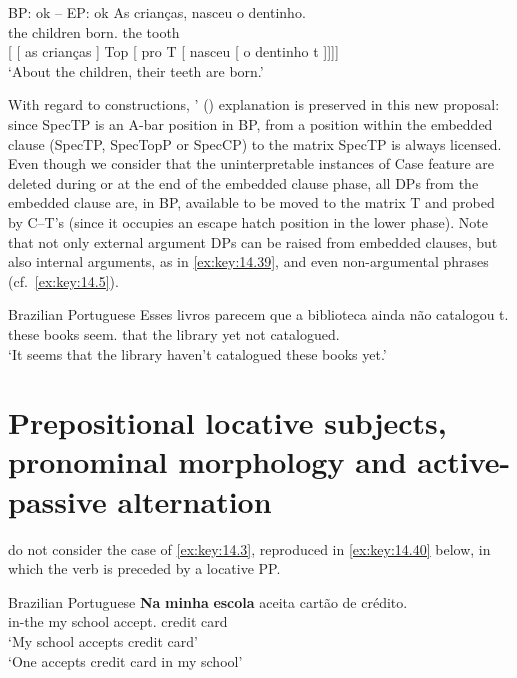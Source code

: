 \documentclass[output=paper]{langsci/langscibook}
\begin{document}
\ea%
    \label{ex:key:14.38} \gls{BP}: ok -- \gls{EP}: ok
    \ea
    \gll    As crianças, nasceu o dentinho.\\
            the children born.\Tsg{} the tooth\\
    \glt
    \ex     {}[ [ as crianças ] Top [ pro\tss{\Expl} T [ nasceu [ o dentinho t ]]]]\\
            ‘About the children, their teeth are born.’
    \z
\z

With regard to  constructions,
\citeauthor{AvelarGalves2011}' (\citeyear{AvelarGalves2011,AvelarGalves2016})
explanation is preserved in this new proposal: since SpecTP is an A-bar
position in BP,  from a position within the embedded clause (SpecTP,
SpecTopP or SpecCP) to the matrix SpecTP is always licensed. Even though we
consider that the uninterpretable instances of Case feature are deleted during
or at the end of the embedded clause phase, all DPs from the embedded clause
are, in BP, available to be moved to the matrix T and probed by C--T’s
 (since it occupies an escape hatch position in the lower
phase).  Note that not only external argument DPs can be raised from embedded
clauses, but also internal arguments, as in \eqref{ex:key:14.39}, and even
non-argumental phrases (cf.\ \eqref{ex:key:14.5}).

\ea\label{ex:key:14.39}Brazilian Portuguese
    \sn
    \gll    Esses  livros parecem que a biblioteca ainda não catalogou t.\\
            these books seem.\Tpl{} that   the library yet not catalogued.\Tsg{}\\
    \glt    ‘It seems that the library haven’t catalogued these books yet.’
\z

\section{Prepositional locative subjects, pronominal morphology and
active-passive alternation}\label{sec:key:14.6}

\textcite{AvelarGalves2011,AvelarGalves2016} do not consider the case of
\eqref{ex:key:14.3}, reproduced in \eqref{ex:key:14.40} below, in which the verb
is preceded by a locative PP.

\ea%
    \label{ex:key:14.40}Brazilian Portuguese
    \sn
    \gll    \textbf{Na} \textbf{minha} \textbf{escola} aceita {cartão de crédito}.\\
            in-the my school accept.\Tsg{} {credit card}\\
    \glt    ‘My school accepts credit card’\\
            ‘One accepts credit card in my school’
\z
\end{document}
